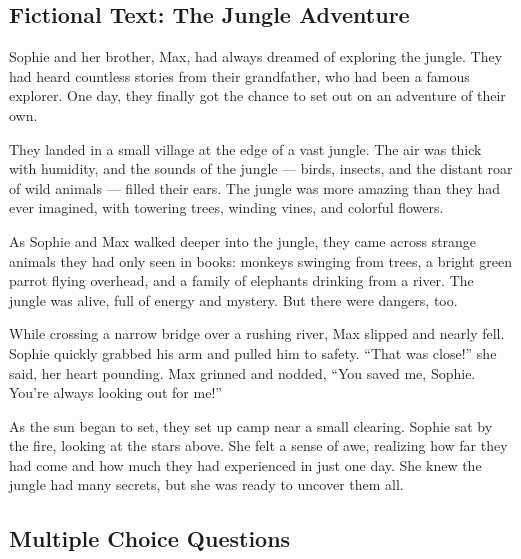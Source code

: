 \documentclass[12pt]{article}
\begin{document}
\onehalfspacing

\subsection*{Fictional Text: The Jungle Adventure}

\begin{tcolorbox}[colframe=black!40, colback=gray!5]

\begin{spacing}{1.15}

Sophie and her brother, Max, had always dreamed of exploring the jungle. They had heard countless stories from their grandfather, who had been a famous explorer. One day, they finally got the chance to set out on an adventure of their own.

They landed in a small village at the edge of a vast jungle. The air was thick with humidity, and the sounds of the jungle — birds, insects, and the distant roar of wild animals — filled their ears. The jungle was more amazing than they had ever imagined, with towering trees, winding vines, and colorful flowers. 

As Sophie and Max walked deeper into the jungle, they came across strange animals they had only seen in books: monkeys swinging from trees, a bright green parrot flying overhead, and a family of elephants drinking from a river. The jungle was alive, full of energy and mystery. But there were dangers, too.

While crossing a narrow bridge over a rushing river, Max slipped and nearly fell. Sophie quickly grabbed his arm and pulled him to safety. “That was close!” she said, her heart pounding. Max grinned and nodded, “You saved me, Sophie. You’re always looking out for me!”

As the sun began to set, they set up camp near a small clearing. Sophie sat by the fire, looking at the stars above. She felt a sense of awe, realizing how far they had come and how much they had experienced in just one day. She knew the jungle had many secrets, but she was ready to uncover them all.

\end{spacing}

\end{tcolorbox}

\subsection*{Multiple Choice Questions}
\end{document}
